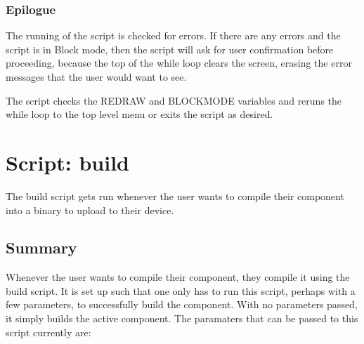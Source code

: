 \documentclass[a4paper, oneside, 11pt, titlepage, onecolumn, openright]{report}
\begin{document}
\subsubsection{Epilogue}
			\label{sss:VFstartEpilogue}
			The running of the script is checked for errors. If there are any errors and the script is in Block mode, then the script will ask for user confirmation before proceeding, because the top of the while loop clears the screen, erasing the error messages that the user would want to see.
			
			The script checks the REDRAW and BLOCKMODE variables and reruns the while loop to the top level menu or exits the script as desired.
			
\section{Script: build}
			\label{s:build}
			The build script gets run whenever the user wants to compile their component into a binary to upload to their device.
			
\subsection{Summary}
			\label{ss:buildSummary}
			Whenever the user wants to compile their component, they compile it using the build script. It is set up such that one only has to run this script, perhaps with a few parameters, to successfully build the component. With no parameters passed, it simply builds the active component.
			The paramaters that can be passed to this script currently are:
			
\end{document}
